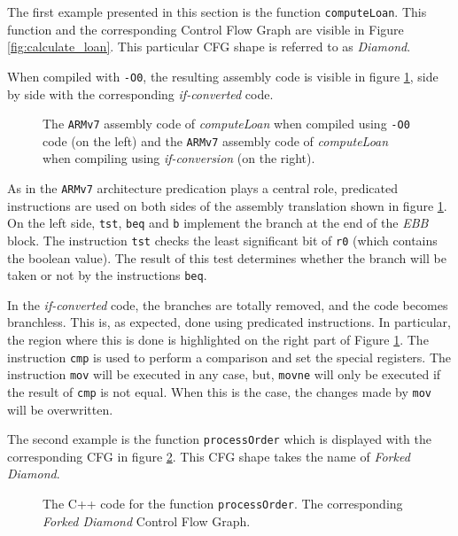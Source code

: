 The first example presented in this section is the function \texttt{computeLoan}. This function and the corresponding Control Flow Graph are visible in Figure \ref{fig:calculate_loan}. This particular CFG shape is referred to as \textit{Diamond}.

When compiled with \texttt{-O0}, the resulting assembly code is visible in figure \ref{fig:calculate_loan_asm}, side by side with the corresponding \textit{if-converted} code.

\begin{figure}[H]
    \centering
    
    \caption[\texttt{ARMv7} Assembly Code of \textit{computeLoan}]{The \texttt{ARMv7} assembly code of \textit{computeLoan} when compiled using \texttt{-O0} code (on the left) and the \texttt{ARMv7} assembly code of \textit{computeLoan} when compiling using \textit{if-conversion} (on the right).}
    \label{fig:calculate_loan_asm}
\end{figure}

As in the \texttt{ARMv7} architecture predication plays a central role, predicated instructions are used on both sides of the assembly translation shown in figure \ref{fig:calculate_loan_asm}. On the left side, \texttt{tst}, \texttt{beq} and \texttt{b} implement the branch at the end of the \textit{EBB} block.
The instruction \texttt{tst} checks the least significant bit of \texttt{r0} (which contains the boolean value). The result of this test determines whether the branch will be taken or not by the instructions \texttt{beq}.

In the \textit{if-converted} code, the branches are totally removed, and the code becomes branchless. This is, as expected, done using predicated instructions. In particular, the region where this is done is highlighted on the right part of Figure \ref{fig:calculate_loan_asm}.
The instruction \texttt{cmp} is used to perform a comparison and set the special registers. The instruction \texttt{mov} will be executed in any case, but, \texttt{movne} will only be executed if the result of \texttt{cmp} is not equal. When this is the case, the changes made by \texttt{mov} will be overwritten.

The second example is the function \texttt{processOrder} which is displayed with the corresponding CFG in figure \ref{fig:processOrder}. This CFG shape takes the name of \textit{Forked Diamond}.

\begin{figure}[H]
    \centering
    
    \caption[Process Order Code and \textit{Forked Diamond}]{The C++ code for the function \texttt{processOrder}. The corresponding \textit{Forked Diamond} Control Flow Graph.}
    \label{fig:processOrder}
\end{figure}


